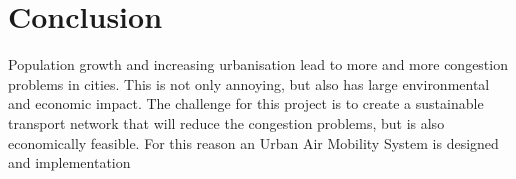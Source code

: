 \newpage
\chapter{Conclusion}
\label{Conclusion}

Population growth and increasing urbanisation lead to more and more congestion problems in cities. This is not only annoying, but also has large environmental and economic impact. The challenge for this project is to create a sustainable transport network that will reduce the congestion problems, but is also economically feasible. For this reason an Urban Air Mobility System is designed and implementation